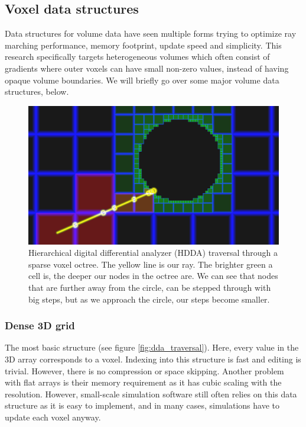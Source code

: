 \subsection{Voxel data structures} \label{related_work:voxel_data_structures}
Data structures for volume data have seen multiple forms trying to optimize ray marching performance, memory footprint, update speed and simplicity. This research specifically targets heterogeneous volumes which often consist of gradients where outer voxels can have small non-zero values, instead of having opaque volume boundaries. We will briefly go over some major volume data structures, below.

\begin{figure}
    \centering
    \includegraphics[width=\linewidth]{figures/esvo_traversal.png}
    \caption{Hierarchical digital differential analyzer (HDDA) traversal through a sparse voxel octree. The yellow line is our ray. The brighter green a cell is, the deeper our nodes in the octree are. We can see that nodes that are further away from the circle, can be stepped through with big steps, but as we approach the circle, our steps become smaller. \cite{ShaderToyQuadtree}}
    \label{fig:esvo}
\end{figure}




\subsubsection{Dense 3D grid} \label{related_work:voxel_data_structures:dense_grid}
The most basic structure (see figure \ref{fig:dda_traversal}). Here, every value in the 3D array corresponds to a voxel. Indexing into this structure is fast and editing is trivial. However, there is no compression or space skipping. Another problem with flat arrays is their memory requirement as it has cubic scaling with the resolution. However, small-scale simulation software still often relies on this data structure as it is easy to implement, and in many cases, simulations have to update each voxel anyway.



